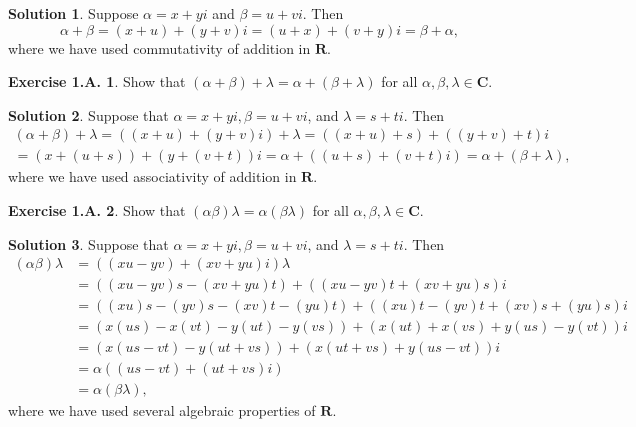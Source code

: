 \documentclass[12pt]{article}
\theoremstyle{definition}
\theoremstyle{exercise}
\newtheorem{exercise}{Exercise 1.A.}
\theoremstyle{solution}
\newtheorem*{solution}{Solution}
\newcommand{\R}{\mathbf{R}}
\newcommand{\C}{\mathbf{C}}
\begin{document}
\begin{solution}
    Suppose \( \alpha = x + yi \) and \( \beta = u + vi \). Then
    \[
        \alpha + \beta = (x + u) + (y + v)i = (u + x) + (v + y)i = \beta + \alpha,
    \]
    where we have used commutativity of addition in \( \R \).
\end{solution}

\begin{exercise}
\label{ex:5}
    Show that \( (\alpha + \beta) + \lambda = \alpha + (\beta + \lambda) \) for all \( \alpha, \beta, \lambda \in \C \).
\end{exercise}

\begin{solution}
    Suppose that \( \alpha = x + yi, \beta = u + vi \), and \( \lambda = s + ti \). Then
    \begin{multline*}
        (\alpha + \beta) + \lambda = ((x + u) + (y + v)i) + \lambda = ((x + u) + s) + ((y + v) + t)i \\ = (x + (u + s)) + (y + (v + t))i = \alpha + ((u + s) + (v + t)i) = \alpha + (\beta + \lambda),
    \end{multline*}
    where we have used associativity of addition in \( \R \).
\end{solution}

\begin{exercise}
\label{ex:6}
    Show that \( (\alpha \beta) \lambda = \alpha (\beta \lambda) \) for all \( \alpha, \beta, \lambda \in \C \).
\end{exercise}

\begin{solution}
    Suppose that \( \alpha = x + yi, \beta = u + vi \), and \( \lambda = s + ti \). Then
    \begin{align*}
        (\alpha \beta) \lambda &= ((xu - yv) + (xv + yu)i) \lambda \\
        &= ((xu - yv)s - (xv + yu)t) + ((xu - yv)t + (xv + yu)s)i \\
        &= ((xu)s - (yv)s - (xv)t - (yu)t) + ((xu)t - (yv)t + (xv)s + (yu)s)i \\
        &= (x(us) - x(vt) - y(ut) - y(vs)) + (x(ut) + x(vs) + y(us) - y(vt))i \\
        &= (x(us - vt) - y(ut + vs)) + (x(ut + vs) + y(us - vt))i \\
        &= \alpha ((us - vt) + (ut + vs)i) \\
        &= \alpha (\beta \lambda),
    \end{align*}
    where we have used several algebraic properties of \( \R \).
\end{solution}
\end{document}
